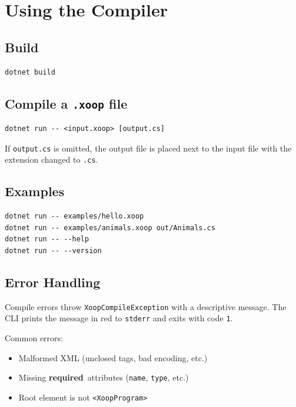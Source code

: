 \documentclass[11pt,a4paper]{article}
\newcommand{\el}[1]{\texttt{\textcolor{xoop-keyword}{<#1>}}}
\newcommand{\attr}[1]{\texttt{\textcolor{xoop-attr}{#1}}}
\newcommand{\cs}[1]{\texttt{#1}}
\newcommand{\required}{\textcolor{xoop-red}{\textbf{required}}}
\begin{document}
\section{Using the Compiler}

\subsection{Build}

\begin{verbatim}
dotnet build
\end{verbatim}

\subsection{Compile a \texttt{.xoop} file}

\begin{verbatim}
dotnet run -- <input.xoop> [output.cs]
\end{verbatim}

If \texttt{output.cs} is omitted, the output file is placed next to the input
file with the extension changed to \texttt{.cs}.

\subsection{Examples}

\begin{verbatim}
dotnet run -- examples/hello.xoop
dotnet run -- examples/animals.xoop out/Animals.cs
dotnet run -- --help
dotnet run -- --version
\end{verbatim}

\subsection{Error Handling}

Compile errors throw \cs{XoopCompileException} with a descriptive message.
The CLI prints the message in red to \texttt{stderr} and exits with code
\texttt{1}.

Common errors:
\begin{itemize}[nosep]
  \item Malformed XML (unclosed tags, bad encoding, etc.)
  \item Missing \required\ attributes (\attr{name}, \attr{type}, etc.)
  \item Root element is not \el{XoopProgram}
\end{itemize}
\end{document}
